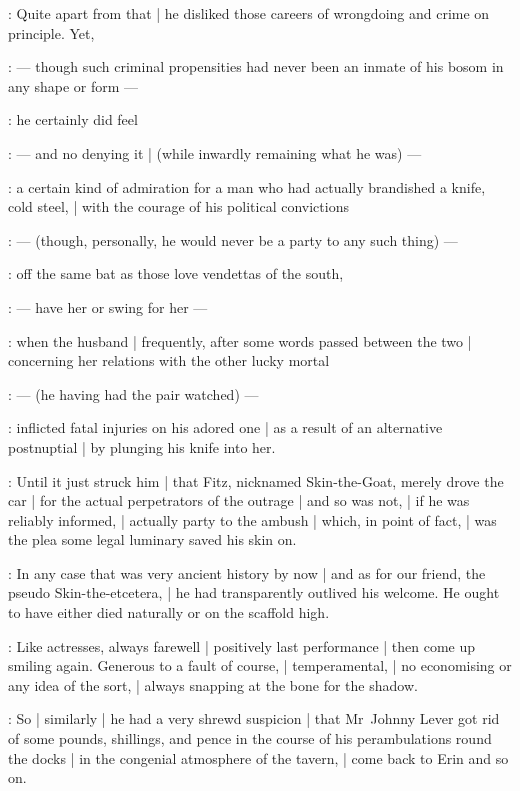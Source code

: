 :
Quite apart from that |
he disliked those careers of wrongdoing and crime on principle.
Yet,

:
    --- though such criminal propensities
        had never been an inmate of his bosom in any shape or form ---

:
he certainly did feel

:
    --- and no denying it |
        (while inwardly remaining what he was) ---

:
a certain kind of admiration
for a man who had actually brandished a knife, cold steel, |
with the courage of his political convictions

:
    --- (though, personally, he would never be a party to any such thing) ---

:
off the same bat as those love vendettas of the south,

:
    --- have her or swing for her ---

:
when the husband |
frequently, after some words passed between the two |
concerning her relations with the other lucky mortal

:
    --- (he having had the pair watched) ---

:
inflicted fatal injuries on his adored one |
as a result of an alternative postnuptial  |
by plunging his knife into her.

:
Until it just struck him |
that Fitz, nicknamed Skin-the-Goat, merely drove the car |
for the actual perpetrators of the outrage |
and so was not, |
if he was reliably informed, |
actually party to the ambush |
which, in point of fact, |
was the plea some legal luminary saved his skin on.

:
In any case that was very ancient history by now |
and as for our friend, the pseudo Skin-the-etcetera, |
he had transparently outlived his welcome.
He ought to have either died naturally or on the scaffold high.

:
Like actresses, always farewell |
positively last performance |
then come up smiling again.
Generous to a fault of course, |
temperamental, |
no economising or any idea of the sort, |
always snapping at the bone for the shadow.

:
So |
similarly |
he had a very shrewd suspicion |
that Mr~Johnny Lever got rid of some pounds, shillings, and pence
in the course of his perambulations round the docks |
in the congenial atmosphere of the  tavern, |
come back to Erin and so on.

